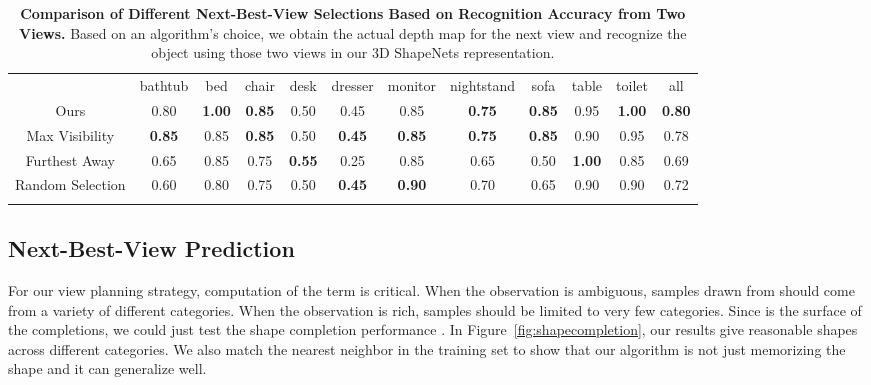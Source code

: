 \documentclass[10pt,twocolumn,letterpaper]{article}
\begin{document}
\begin{table*}[t]
\vspace*{5mm}
\centering
\setlength{\tabcolsep}{9.4pt}
{
\centering
\footnotesize
\begin{tabular}{c|c|c|c|c|c|c|c|c|c|c|c}
\Xhline{2\arrayrulewidth}
 & bathtub & bed & chair & desk & dresser & monitor & \hspace{-1mm}nightstand\hspace{-1mm}  & \hspace{1mm}sofa\hspace{1mm} & table & toilet & all\tabularnewline
\Xhline{2\arrayrulewidth}
Ours & 0.80 & {\bf 1.00} & {\bf 0.85} & 0.50 & {\bf }0.45 & 0.85 & {\bf 0.75}   & {\bf 0.85} & 0.95 & {\bf 1.00} & {\bf 0.80}\tabularnewline
\hline 
Max Visibility & {\bf 0.85}  &  0.85  & {\bf  0.85} & 0.50 & {\bf 0.45} & {\bf 0.85} & {\bf 0.75} & {\bf 0.85} & 0.90 &  0.95  & 0.78\tabularnewline
\hline 
Furthest Away & 0.65 &  0.85  & 0.75 & {\bf 0.55} & 0.25 & 0.85  &  0.65 & 0.50 & {\bf 1.00} &  0.85 & 0.69\tabularnewline
\hline 
Random Selection & 0.60  &  0.80  & 0.75 & 0.50 & {\bf 0.45} & {\bf 0.90} & 0.70 & 0.65 & 0.90  & 0.90 & 0.72\tabularnewline
\Xhline{2\arrayrulewidth}
\end{tabular}
}
\vspace*{-2mm}
\caption{{\bf Comparison of Different Next-Best-View Selections Based on Recognition Accuracy from Two Views.}
Based on an algorithm's choice, we obtain the actual depth map for the next view and recognize 
the object using those two views in our 3D ShapeNets representation.
}
\label{table:nbv}
\end{table*}

\subsection{Next-Best-View Prediction}








For our view planning strategy, computation of the term  is critical. When the observation  is ambiguous, samples drawn from  should come from a variety of different categories. When the observation is rich, samples should be limited to very few categories. Since  is the surface of the completions, we could just test the shape completion performance . In Figure~\ref{fig:shapecompletion}, our results give reasonable shapes across different categories. 
We also match the nearest neighbor in the training set to show that our algorithm is not just memorizing the shape and it can generalize well.
\end{document}
